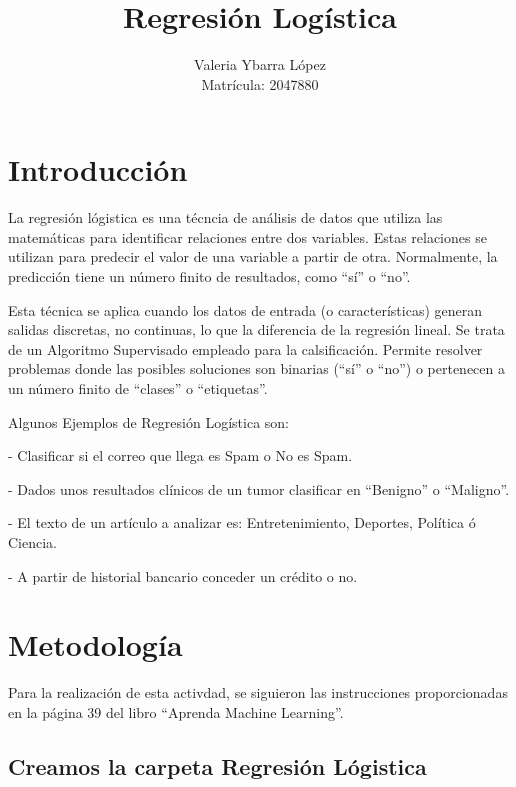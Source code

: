 \documentclass{pssbmac}
\begin{document}
\title{Regresión Logística}

\author{
    {\large Valeria Ybarra López}\\
    {\small Matrícula: 2047880} \\
}
\criartitulo



\noindent


\section{Introducción}
La regresión lógistica es una técncia de análisis de datos que utiliza las matemáticas para identificar relaciones entre dos variables. Estas relaciones se utilizan para predecir el valor de una variable a partir de otra. Normalmente, la predicción tiene un número finito de resultados, como ``sí'' o ``no''.



Esta técnica se aplica cuando los datos de entrada (o características) generan salidas discretas, no continuas, lo que la diferencia de la regresión lineal. Se trata de un Algoritmo Supervisado empleado para la calsificación. Permite resolver problemas donde las posibles soluciones son binarias (``sí'' o ``no'') o pertenecen a un número finito de ``clases'' o ``etiquetas''.



Algunos Ejemplos de Regresión Logística son:


- Clasificar si el correo que llega es Spam o No es Spam.


- Dados unos resultados clínicos de un tumor clasificar en “Benigno” o “Maligno”.



- El texto de un artículo a analizar es: Entretenimiento, Deportes, Política ó Ciencia.



- A partir de historial bancario conceder un crédito o no.
 

\section{Metodología}

Para la realización de esta activdad, se siguieron las instrucciones proporcionadas en la página 39 del libro ``Aprenda Machine Learning''.
\subsection{Creamos la carpeta Regresión Lógistica}
\end{document}

